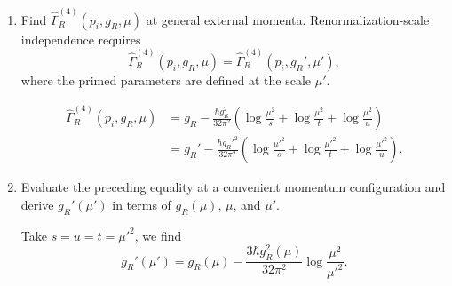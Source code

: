 \begin{enumerate}[label=\alph*)]
    \item Find $\widehat\Gamma_R^{(4)}(p_i,g_R,\mu)$ at general external momenta.
    Renormalization-scale independence requires
    \begin{equation}
        \widehat\Gamma_R^{(4)}(p_i,g_R,\mu)
        =\widehat\Gamma_R^{(4)}(p_i,g_R',\mu'),
    \end{equation}
    where the primed parameters are defined at the scale $\mu'$.
    \begin{solution}
        \begin{equation}
        \begin{aligned}
            \widehat\Gamma_R^{(4)}(p_i,g_R,\mu) &= g_R -\frac{\hbar g_R^2}{32\pi^2}\left(\log\frac{\mu^2}{s} + \log\frac{\mu^2}{t} +\log\frac{\mu^2}{u}\right)\\
            &=g_R' -\frac{\hbar g_R'^2}{32\pi^2}\left(\log\frac{\mu'^2}{s} + \log\frac{\mu'^2}{t} +\log\frac{\mu'^2}{u}\right).
        \end{aligned}
        \end{equation}
    \end{solution}

    \item Evaluate the preceding equality at a convenient momentum configuration
    and derive $g_R'(\mu')$ in terms of $g_R(\mu)$, $\mu$, and $\mu'$.
    \begin{solution}
        Take $s=u=t = \mu'^2$, we find
        \begin{equation}
            g_R'(\mu') = g_R(\mu) -\frac{3\hbar g_R^2(\mu)}{32\pi^2}\log\frac{\mu^2}{\mu'^2}.
        \end{equation}
    \end{solution}


\end{enumerate}

